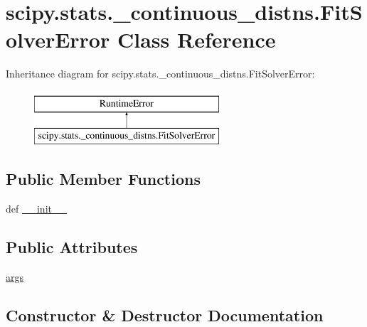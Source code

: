 \hypertarget{classscipy_1_1stats_1_1__continuous__distns_1_1FitSolverError}{}\section{scipy.\+stats.\+\_\+continuous\+\_\+distns.\+Fit\+Solver\+Error Class Reference}
\label{classscipy_1_1stats_1_1__continuous__distns_1_1FitSolverError}
Inheritance diagram for scipy.\+stats.\+\_\+continuous\+\_\+distns.\+Fit\+Solver\+Error\+:\begin{figure}[H]
\begin{center}
\leavevmode
\includegraphics[height=2.000000cm]{classscipy_1_1stats_1_1__continuous__distns_1_1FitSolverError}
\end{center}
\end{figure}
\subsection*{Public Member Functions}
\begin{DoxyCompactItemize}
\item 
def \hyperlink{classscipy_1_1stats_1_1__continuous__distns_1_1FitSolverError_afee88e5150b11a6d3469cbc1b6384741}{\+\_\+\+\_\+init\+\_\+\+\_\+}
\end{DoxyCompactItemize}
\subsection*{Public Attributes}
\begin{DoxyCompactItemize}
\item 
\hyperlink{classscipy_1_1stats_1_1__continuous__distns_1_1FitSolverError_af5264b54e628ec90f5d83072ae028b41}{args}
\end{DoxyCompactItemize}


\subsection{Constructor \& Destructor Documentation}
\hypertarget{classscipy_1_1stats_1_1__continuous__distns_1_1FitSolverError_afee88e5150b11a6d3469cbc1b6384741}{}

